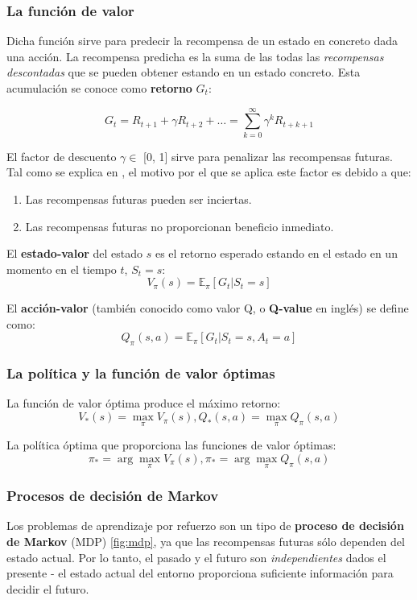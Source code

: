 \subsubsection{La función de valor}
Dicha función sirve para predecir la recompensa de un estado en concreto dada una acción. La recompensa predicha es la suma de las todas las \textit{recompensas descontadas} que se pueden obtener estando en un estado concreto. Esta acumulación se conoce como \textbf{retorno} $G_t$: 

\[ G_t = R_{t+1} + \gamma R_{t+2} + \ldots = \sum_{k = 0}^{\infty} \gamma^k R_{t+k+1} \]

El factor de descuento $\gamma \in$ [0, 1] sirve para penalizar las recompensas futuras. Tal como se explica en \cite{lilLogRL}, el motivo por el que se aplica este factor es debido a que: 
\begin{enumerate}
    \item Las recompensas futuras pueden ser inciertas.
    \item Las recompensas futuras no proporcionan beneficio inmediato. 
\end{enumerate}

El \textbf{estado-valor} del estado $s$ es el retorno esperado estando en el estado en un momento en el tiempo $t$, $S_t = s$:
\[V_\pi(s) = \mathbb{E}_\pi[G_t|S_t=s]\]

El \textbf{acción-valor} (también conocido como valor Q, o \textbf{Q-value} en inglés) se define como:
\[Q_\pi(s, a)=\mathbb{E}_\pi[G_t|S_t = s, A_t=a]\]

\subsubsection{La política y la función de valor óptimas}

La función de valor óptima produce el máximo retorno:
\[V_*(s)= \max_{\pi}V_\pi(s), Q_*(s, a)=\max_\pi Q_\pi(s, a)\]

La política óptima que proporciona las funciones de valor óptimas:
\[\pi_*=\arg\max_\pi V_\pi(s), \pi_* = \arg\max_\pi Q_\pi(s, a)\]

\subsubsection{Procesos de decisión de Markov}

Los problemas de aprendizaje por refuerzo son un tipo de \textbf{proceso de decisión de Markov} (MDP) \ref{fig:mdp}, ya que las recompensas futuras sólo dependen del estado actual. Por lo tanto, el pasado y el futuro son \textit{independientes} dados el presente - el estado actual del entorno proporciona suficiente información para decidir el futuro. \\

